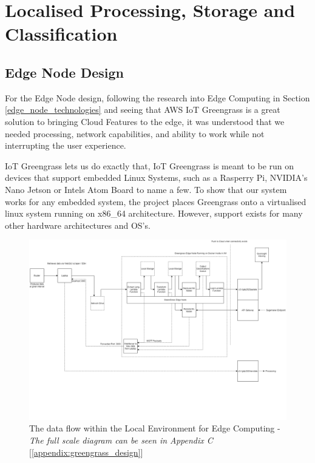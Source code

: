 \section{Localised Processing, Storage and Classification}
% 

\subsection{Edge Node Design}
For the Edge Node design, following the research into Edge Computing in Section \ref{edge_node_technologies} and seeing that AWS IoT Greengrass is a great solution to bringing Cloud Features to the edge, it was understood that we needed processing, network capabilities, and ability to work while not interrupting the user experience. 

IoT Greengrass lets us do exactly that, IoT Greengrass is meant to be run on devices that support embedded Linux Systems, such as a Rasperry Pi, NVIDIA's Nano Jetson or Intels Atom Board to name a few. To show that our system works for any embedded system, the project places Greengrass onto a virtualised linux system running on x86\_64 architecture. However, support exists for many  other hardware architectures and OS's.
\begin{figure}[ht]
    \centering
    \includegraphics[width=1\linewidth]{pages/Chapter3/Chapter 3 images/greengrass_data_flow.png}
    \caption{The data flow within the Local Environment for Edge Computing -\textit{ The full scale diagram can be seen in Appendix C} [\ref{appendix:greengrass_design}]}
    \label{fig:greengrass_edge_design}
\end{figure}

